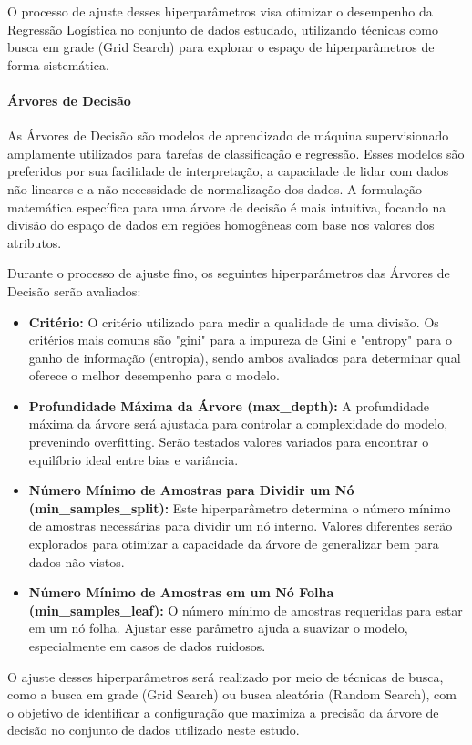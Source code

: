 O processo de ajuste desses hiperparâmetros visa otimizar o desempenho da Regressão Logística no conjunto de dados estudado, utilizando técnicas como busca em grade (Grid Search) para explorar o espaço de hiperparâmetros de forma sistemática.

\paragraph{Árvores de Decisão}

As Árvores de Decisão são modelos de aprendizado de máquina supervisionado amplamente utilizados para tarefas de classificação e regressão. Esses modelos são preferidos por sua facilidade de interpretação, a capacidade de lidar com dados não lineares e a não necessidade de normalização dos dados. A formulação matemática específica para uma árvore de decisão é mais intuitiva, focando na divisão do espaço de dados em regiões homogêneas com base nos valores dos atributos.

Durante o processo de ajuste fino, os seguintes hiperparâmetros das Árvores de Decisão serão avaliados:

\begin{itemize}
    \item \textbf{Critério:} O critério utilizado para medir a qualidade de uma divisão. Os critérios mais comuns são "gini" para a impureza de Gini e "entropy" para o ganho de informação (entropia), sendo ambos avaliados para determinar qual oferece o melhor desempenho para o modelo.
    \item \textbf{Profundidade Máxima da Árvore (max\_depth):} A profundidade máxima da árvore será ajustada para controlar a complexidade do modelo, prevenindo overfitting. Serão testados valores variados para encontrar o equilíbrio ideal entre bias e variância.
    \item \textbf{Número Mínimo de Amostras para Dividir um Nó (min\_samples\_split):} Este hiperparâmetro determina o número mínimo de amostras necessárias para dividir um nó interno. Valores diferentes serão explorados para otimizar a capacidade da árvore de generalizar bem para dados não vistos.
    \item \textbf{Número Mínimo de Amostras em um Nó Folha (min\_samples\_leaf):} O número mínimo de amostras requeridas para estar em um nó folha. Ajustar esse parâmetro ajuda a suavizar o modelo, especialmente em casos de dados ruidosos.
\end{itemize}

O ajuste desses hiperparâmetros será realizado por meio de técnicas de busca, como a busca em grade (Grid Search) ou busca aleatória (Random Search), com o objetivo de identificar a configuração que maximiza a precisão da árvore de decisão no conjunto de dados utilizado neste estudo.

